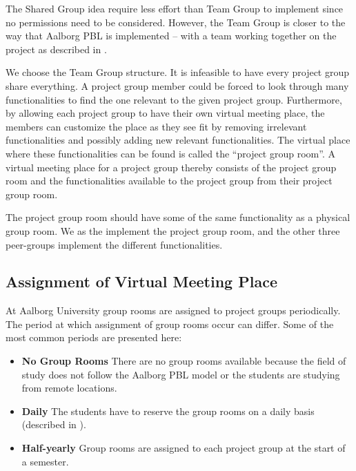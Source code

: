 The Shared Group idea require less effort than Team Group to implement since no permissions need to be considered.
However, the Team Group is closer to the way that Aalborg PBL is implemented -- with a team working together on the project as described in .

We choose the Team Group structure. 
It is infeasible to have every project group share everything.
A project group member could be forced to look through many functionalities to find the one relevant to the given project group.
Furthermore, by allowing each project group to have their own virtual meeting place, the members can customize the place as they see fit by removing irrelevant functionalities and possibly adding new relevant functionalities.
The virtual place where these functionalities can be found is called the ``project group room''.
A virtual meeting place for a project group thereby consists of the project group room and the functionalities available to the project group from their project group room.

The project group room should have some of the same functionality as a physical group room.
We as the \groupname{} implement the project group room, and the other three peer-groups implement the different functionalities.


\subsection{Assignment of Virtual Meeting Place}
At Aalborg University group rooms are assigned to project groups periodically.
The period at which assignment of group rooms occur can differ.
Some of the most common periods are presented here:
\begin{itemize}
	\item \textbf{No Group Rooms} There are no group rooms available because the field of study does not follow the Aalborg PBL model or the students are studying from remote locations.
	\item \textbf{Daily} The students have to reserve the group rooms on a daily basis (described in ).
	\item \textbf{Half-yearly} Group rooms are assigned to each project group at the start of a semester.
\end{itemize} 

